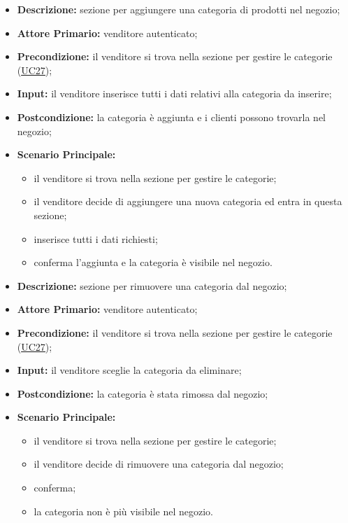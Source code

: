 \label{sec:UC27.1}
\begin{itemize}
    \item \textbf{Descrizione:} sezione per aggiungere una categoria di prodotti nel negozio;
    \item \textbf{Attore Primario:} venditore autenticato;
    \item \textbf{Precondizione:} il venditore si trova nella sezione per gestire le categorie (\hyperref[sec:UC27]{\underline{UC27}});
    \item \textbf{Input:} il venditore inserisce tutti i dati relativi alla categoria da inserire;
    \item \textbf{Postcondizione:} la categoria è aggiunta e i clienti possono trovarla nel negozio;
    \item \textbf{Scenario Principale:}
          \begin{itemize}
              \item il venditore si trova nella sezione per gestire le categorie;
              \item il venditore decide di aggiungere una nuova categoria ed entra in questa sezione;
              \item inserisce tutti i dati richiesti;
              \item conferma l'aggiunta e la categoria è visibile nel negozio.
          \end{itemize}
\end{itemize}
\label{sec:UC27.2}
\begin{itemize}
    \item \textbf{Descrizione:} sezione per rimuovere una categoria dal negozio;
    \item \textbf{Attore Primario:} venditore autenticato;
    \item \textbf{Precondizione:} il venditore si trova nella sezione per gestire le categorie (\hyperref[sec:UC27]{\underline{UC27}});
    \item \textbf{Input:} il venditore sceglie la categoria da eliminare;
    \item \textbf{Postcondizione:} la categoria è stata rimossa dal negozio;
    \item \textbf{Scenario Principale:}
          \begin{itemize}
              \item il venditore si trova nella sezione per gestire le categorie;
              \item il venditore decide di rimuovere una categoria dal negozio;
              \item conferma;
              \item la categoria non è più visibile nel negozio.
          \end{itemize}
\end{itemize}


